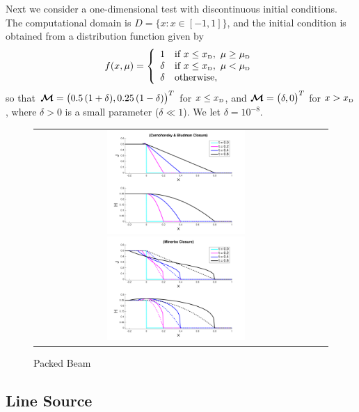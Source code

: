 Next we consider a one-dimensional test with discontinuous initial conditions.  
The computational domain is $D=\{x:x\in[-1,1]\}$, and the initial condition is obtained from a distribution function given by
\begin{equation}
  f(x,\mu)
  =\left\{
  \begin{array}{cl}
    1        & \text{if} ~ x\le x_{\mbox{\tiny D}}, ~ \mu\ge\mu_{\mbox{\tiny D}} \\
    \delta & \text{if} ~ x\le x_{\mbox{\tiny D}}, ~ \mu<   \mu_{\mbox{\tiny D}} \\
    \delta & \text{otherwise},
  \end{array}
  \right.
\end{equation}
so that $\boldsymbol{\mathcal{M}}=\big(0.5\,(1+\delta),0.25\,(1-\delta)\big)^{T}$ for $x\le x_{\mbox{\tiny D}}$, and $\boldsymbol{\mathcal{M}}=\big(\delta,0\big)^{T}$ for $x> x_{\mbox{\tiny D}}$, where $\delta>0$ is a small parameter ($\delta\ll1$).  
We let $\delta=10^{-8}$.  
\begin{figure}[h]
  \centering
  \begin{tabular}{cc}
    \includegraphics[width=0.5\textwidth]{figures/PackedBeam_ME_CB}
    \includegraphics[width=0.5\textwidth]{figures/PackedBeam_ME_MI}
  \end{tabular}
   \caption{Packed Beam}
  \label{fig:PackedBeam}
\end{figure}

\subsection{Line Source}

